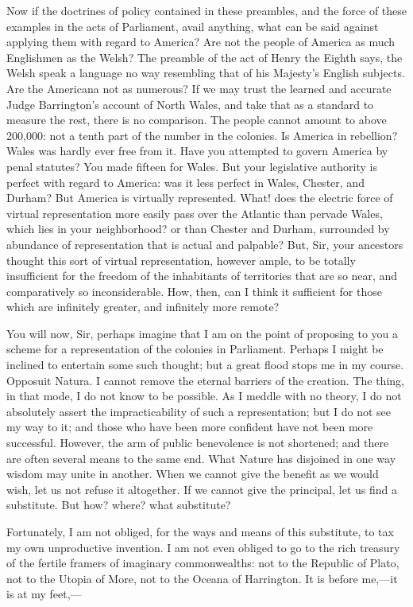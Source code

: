 Now if the doctrines of policy contained in these preambles, and the force of these examples in the acts of Parliament, avail anything, what can be said against applying them with regard to America? Are not the people of America as much Englishmen as the Welsh? The preamble of the act of Henry the Eighth says, the Welsh speak a language no way resembling that of his Majesty's English subjects. Are the Americana not as numerous? If we may trust the learned and accurate Judge Barrington's account of North Wales, and take that as a standard to measure the rest, there is no comparison. The people cannot amount to above 200,000: not a tenth part of the number in the colonies. Is America in rebellion? Wales was hardly ever free from it. Have you attempted to govern America by penal statutes? You made fifteen for Wales. But your legislative authority is perfect with regard to America: was it less perfect in Wales, Chester, and Durham? But America is virtually represented. What! does the electric force of virtual representation more easily pass over the Atlantic than pervade Wales, which lies in your neighborhood? or than Chester and Durham, surrounded by abundance of representation that is actual and palpable? But, Sir, your ancestors thought this sort of virtual representation, however ample, to be totally insufficient for the freedom of the inhabitants of territories that are so near, and comparatively so inconsiderable. How, then, can I think it sufficient for those which are infinitely greater, and infinitely more remote?

You will now, Sir, perhaps imagine that I am on the point of proposing to you a scheme for a representation of the colonies in Parliament. Perhaps I might be inclined to entertain some such thought; but a great flood stops me in my course. Opposuit Natura. I cannot remove the eternal barriers of the creation. The thing, in that mode, I do not know to be possible. As I meddle with no theory, I do not absolutely assert the impracticability of such a representation; but I do not see my way to it; and those who have been more confident have not been more successful. However, the arm of public benevolence is not shortened; and there are often several means to the same end. What Nature has disjoined in one way wisdom may unite in another. When we cannot give the benefit as we would wish, let us not refuse it altogether. If we cannot give the principal, let us find a substitute. But how? where? what substitute?

Fortunately, I am not obliged, for the ways and means of this substitute, to tax my own unproductive invention. I am not even obliged to go to the rich treasury of the fertile framers of imaginary commonwealths: not to the Republic of Plato, not to the Utopia of More, not to the Oceana of Harrington. It is before me,—it is at my feet,—

